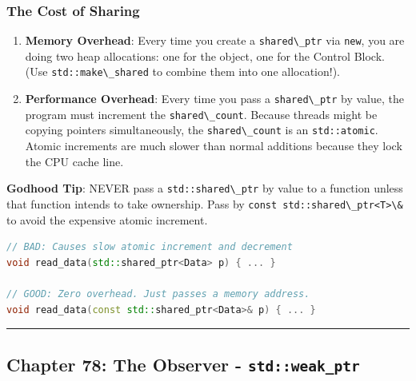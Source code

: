 \hypertarget{the-cost-of-sharing}{%
\subsubsection{The Cost of Sharing}\label{the-cost-of-sharing}}

\begin{enumerate}
\def\labelenumi{\arabic{enumi}.}
\tightlist
\item
  \textbf{Memory Overhead}: Every time you create a
  \passthrough{\lstinline!shared\_ptr!} via
  \passthrough{\lstinline!new!}, you are doing two heap allocations: one
  for the object, one for the Control Block. (Use
  \passthrough{\lstinline!std::make\_shared!} to combine them into one
  allocation!).
\item
  \textbf{Performance Overhead}: Every time you pass a
  \passthrough{\lstinline!shared\_ptr!} by value, the program must
  increment the \passthrough{\lstinline!shared\_count!}. Because threads
  might be copying pointers simultaneously, the
  \passthrough{\lstinline!shared\_count!} is an
  \passthrough{\lstinline!std::atomic!}. Atomic increments are much
  slower than normal additions because they lock the CPU cache line.
\end{enumerate}

\textbf{Godhood Tip}: NEVER pass a
\passthrough{\lstinline!std::shared\_ptr!} by value to a function unless
that function intends to take ownership. Pass by
\passthrough{\lstinline!const std::shared\_ptr<T>\&!} to avoid the
expensive atomic increment.

\begin{lstlisting}[language={C++}]
// BAD: Causes slow atomic increment and decrement
void read_data(std::shared_ptr<Data> p) { ... }

// GOOD: Zero overhead. Just passes a memory address.
void read_data(const std::shared_ptr<Data>& p) { ... }
\end{lstlisting}

\begin{center}\rule{0.5\linewidth}{0.5pt}\end{center}

\hypertarget{chapter-78-the-observer---stdweak_ptr}{%
\subsection{\texorpdfstring{Chapter 78: The Observer -
\texttt{std::weak\_ptr}}{Chapter 78: The Observer - std::weak\_ptr}}\label{chapter-78-the-observer---stdweak_ptr}}

